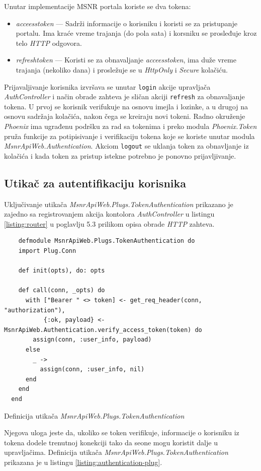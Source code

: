 \documentclass[12pt,oneside]{memoir}
\begin{document}
Unutar implementacije MSNR portala koriste se dva tokena: \begin{itemize}
\item \emph{acceess{\textunderscore}token} --- Sadrži informacije o korisniku i koristi se za pristupanje portalu. Ima kraće vreme trajanja (do pola sata) i korsniku se prosleđuje kroz telo \emph{HTTP} odgovora.
\item \emph{refresh{\textunderscore}token} --- Koristi se za obnavaljanje \emph{acceess{\textunderscore}token}, ima duže vreme trajanja (nekoliko dana) i prosležuje se u \emph{HttpOnly} i \emph{Secure} kolačiću.  
\end{itemize}

Prijavaljivanje korisnika izvršava se unutar \texttt{login} akcije upravljača \emph{AuthController} i
način obrade zahteva je sličan akciji \texttt{refresh} za obnavaljanje tokena. U prvoj se
korisnik verifukuje na osnovu imejla i lozinke, a u drugoj na osnovu sadržaja kolačića, nakon čega se kreiraju novi tokeni.
Radno okruženje \emph{Phoenix} ima ugrađenu podršku za rad sa tokenima i preko modula \emph{Phoenix.Token}
pruža funkcije za potipisivanje i verifikaciju tokena koje se koriste unutar modula \emph{MsnrApiWeb.Authentication}.
Akciom \texttt{logout} se uklanja token za obnavljanje iz kolačića i kada token za pristup istekne potrebno je ponovno prijavljivanje. 

\subsection{Utikač za autentifikaciju korisnika}
Uključivanje utikača \emph{MsnrApiWeb.Plugs.TokenAuthentication} prikazano je zajedno sa registrovanjem akcija kontolora
\emph{AuthController} u listingu \ref{listing:router} u poglavlju 5.3 prilikom opisa obrade \emph{HTTP} zahteva.
\begin{listing}[h!]
  \begin{verbatim}
    defmodule MsnrApiWeb.Plugs.TokenAuthentication do
    import Plug.Conn
  
    def init(opts), do: opts
  
    def call(conn, _opts) do
      with ["Bearer " <> token] <- get_req_header(conn, "authorization"),
           {:ok, payload} <- MsnrApiWeb.Authentication.verify_access_token(token) do
        assign(conn, :user_info, payload)
      else
        _ ->
          assign(conn, :user_info, nil)
      end
    end
  end
\end{verbatim}
\caption{Definicija utikača \emph{MsnrApiWeb.Plugs.TokenAuthentication}}
\label{listing:authentication-plug}
\end{listing}
Njegova uloga jeste da, ukoliko se token verifikuje, informacije o korisniku iz tokena dodele trenutnoj konekciji tako
da seone mogu koristit dalje u upravljačima. Definicija utikača \emph{MsnrApiWeb.Plugs.TokenAuthentication} prikazana je u
listingu \ref{listing:authentication-plug}.
\end{document}
